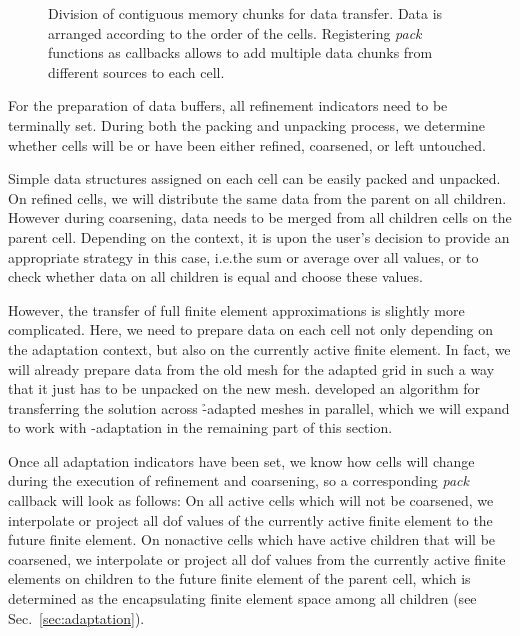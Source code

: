 \begin{figure}
\centering

\caption[Division of contiguous memory chunks for data transfer.]{Division of contiguous memory chunks for data transfer. Data is arranged according to the order of the cells. Registering \textit{pack} functions as callbacks allows to add multiple data chunks from different sources to each cell.}
\label{fig:memory}
\end{figure}

For the preparation of data buffers, all refinement indicators need to be terminally set. During both the packing and unpacking process, we determine whether cells will be or have been either refined, coarsened, or left untouched.

Simple data structures assigned on each cell can be easily packed and unpacked. On refined cells, we will distribute the same data from the parent on all children. However during coarsening, data needs to be merged from all children cells on the parent cell. Depending on the context, it is upon the user's decision to provide an appropriate strategy in this case, i.e.\@ the sum or average over all values, or to check whether data on all children is equal and choose these values.

However, the transfer of full finite element approximations is slightly more complicated. Here, we need to prepare data on each cell not only depending on the adaptation context, but also on the currently active finite element. In fact, we will already prepare data from the old mesh for the adapted grid in such a way that it just has to be unpacked on the new mesh. \textcite{bangerth2012} developed an algorithm for transferring the solution across \h-adapted meshes in parallel, which we will expand to work with \hp-adaptation in the remaining part of this section.

Once all adaptation indicators have been set, we know how cells will change during the execution of refinement and coarsening, so a corresponding \textit{pack} callback will look as follows: On all active cells which will not be coarsened, we interpolate or project all \gls{dof} values of the currently active finite element to the future finite element. On nonactive cells which have active children that will be coarsened, we interpolate or project all \gls{dof} values from the currently active finite elements on children to the future finite element of the parent cell, which is determined as the encapsulating finite element space among all children (see Sec.~\ref{sec:adaptation}).

